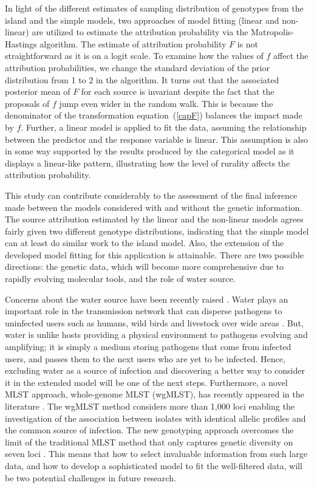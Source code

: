 \documentclass[times, doublespace]{WileyNJD-v2}%
\begin{document}
In light of the different estimates of sampling distribution of genotypes from the island and the simple models, two approaches of model fitting (linear and non-linear) are utilized to estimate the attribution probability via the Matropolis-Hastings algorithm. The estimate of attribution probability $F$ is not straightforward as it is on a logit scale. To examine how the values of $f$ affect the attribution probabilities, we change the standard deviation of the prior distribution from 1 to 2 in the algorithm. It turns out that the associated posterior mean of $F$ for each source is invariant despite the fact that the proposals of $f$ jump even wider in the random walk. This is because the denominator of the transformation equation~(\ref{capF}) balances the impact made by $f$. Further, a linear model is applied to fit the data, assuming the relationship between the predictor and the response variable is linear. This assumption is also in some way supported by the results produced by the categorical model as it displays a linear-like pattern, illustrating how the level of rurality affects the attribution probability. 

This study can contribute considerably to the assessment of the final inference made between the models considered with and without the genetic information. The source attribution estimated by the linear and the non-linear models agrees fairly given two different genotype distributions, indicating that the simple model can at least do similar work to the island model. Also, the extension of the developed model fitting for this application is attainable. There are two possible directions: the genetic data, which will become more comprehensive due to rapidly evolving molecular tools, and the role of water source.

Concerns about the water source have been recently raised \cite{Wagen}. Water plays an important role in the transmission network that can disperse pathogens to uninfected users such as humans, wild birds and livestock over wide areas \cite{Cart, Skel, Leve, Case}. But, water is unlike hosts providing a physical environment to pathogens evolving and amplifying; it is simply a medium storing pathogens that come from infected users, and passes them to the next users who are yet to be infected. Hence, excluding water as a source of infection and discovering a better way to consider it in the extended model will be one of the next steps. Furthermore, a novel MLST approach, whole-genome MLST (wgMLST), has recently appeared in the literature \cite{Bigg, Kova, Llar}. The wgMLST method considers more than 1,000 loci enabling the investigation of the association between isolates with identical allelic profiles and the common source of infection. The new genotyping approach overcomes the limit of the traditional MLST method that only captures genetic diversity on seven loci \cite{Bigg}. This means that how to select invaluable information from such large data, and how to develop a sophisticated model to fit the well-filtered data, will be two potential challenges in future research.
\end{document}
